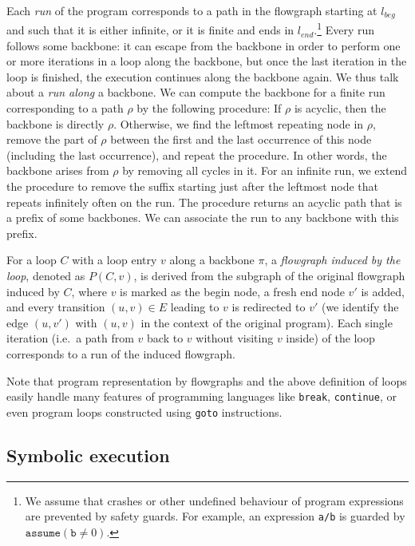 \documentclass[10pt,a4paper]{article}
\newcommand{\var}[1]{\texttt{#1}}
\begin{document}
Each \emph{run} of the program corresponds to a path in the flowgraph
starting at $l_\mathit{beg}$ and such that it is either infinite, or it is
finite and ends in $l_\mathit{end}$.\footnote{We assume that crashes or
  other undefined behaviour of program expressions are prevented by safety
  guards. For example, an expression \texttt{a/b} is guarded by
  $\texttt{assume}(\var{b}\neq 0)$.}  Every run follows some
backbone: it can escape from the backbone in order to perform
one or more iterations in a loop along the backbone, but once the last
iteration in the loop is finished, the execution continues along the
backbone again. We thus talk about a \emph{run along} a backbone. We can
compute the backbone for a finite run corresponding to a path $\rho$ by the
following procedure: If $\rho$ is acyclic, then the backbone is directly
$\rho$. Otherwise, we find the leftmost repeating node in $\rho$, remove the
part of $\rho$ between the first and the last occurrence of this node
(including the last occurrence), and repeat the procedure. In other words,
the backbone arises from $\rho$ by removing all cycles in it. For an
infinite run, we extend the procedure to remove the suffix starting just
after the leftmost node that repeats infinitely often on the run. The
procedure returns an acyclic path that is a prefix of some backbones. We can
associate the run to any backbone with this prefix.

For a loop $C$ with a loop entry $v$ along a backbone $\pi$, a
\emph{flowgraph induced by the loop}, denoted as $P(C,v)$, is derived from
the subgraph of the original flowgraph induced by $C$, where $v$ is marked
as the begin node, a fresh end node $v'$ is added, and every transition $(u,v)\in E$ leading to $v$ is redirected to $v'$ (we
identify the edge $(u,v')$ with $(u,v)$ in the context of the original
program). Each single iteration (i.e.~a path from $v$ back to $v$ without
visiting $v$ inside) of the loop corresponds to a run of the
induced flowgraph. 


Note that program representation by flowgraphs and the above definition of
loops easily handle many features of programming languages like
\texttt{break}, \texttt{continue}, or even program loops constructed using
\texttt{goto} instructions.

\subsection{Symbolic execution}
\label{sec:symexpr}
\end{document}
